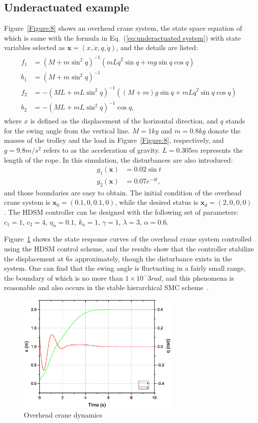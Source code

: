 \documentclass[3p]{elsarticle}
\theoremstyle{plain}
\theoremstyle{remark}
\begin{document}
\subsection{Underactuated example}
Figure~\ref{Figure:8} shows an overhead crane system, the state space equation of which is same with the formula in Eq.~(\ref{eq:underactuated system}) with state variables selected as $\bm x=(x,\dot x,q,\dot q)$, and the details are listed:
\begin{align}
\begin{split}
f_1&=(M+m\sin^2q)^{-1}(mL\dot q^2\sin q+mg\sin q\cos q)\\
b_1&=(M+m\sin^2q)^{-1}\\
f_2&=-(ML+mL\sin^2q)^{-1}((M+m)g\sin q+mL\dot q^2\sin q\cos q)\\
b_2&=-(ML+mL\sin^2q)^{-1}\cos q,
\end{split}
\end{align}
where $x$ is defined as the displacement of the horizontal direction, and $q$ stands for the swing angle from the vertical line. $M=1kg$ and $m=0.8kg$ donate the masses of the trolley and the load in Figure~\ref{Figure:8}, respectively, and $g=9.8m/s^2$ refers to as the acceleration of gravity. $L=0.305m$ represents the length of the rope. In this simulation, the disturbances are also introduced:
\begin{align}
g_1(\bm x)&= 0.02\sin t\\
g_2(\bm x)&=0.07e^{-4t},
\end{align}
and those boundaries are easy to obtain. The initial condition of the overhead crane system is $\bm x_0 = (0.1,0,0.1,0)$, while the desired status is $\bm x_d = (2,0,0,0)$. The HDSM controller can be designed with the following set of parameters:
$c_1=1$, $c_2=4$, $\eta_u = 0.1$, $k_u=1$, $\gamma = 1$, $\lambda = 3$, $\alpha = 0.6$.\par
Figure~\ref{Figure:9} shows the state response curves of the overhead crane system controlled using the HDSM control scheme, and the results show that the controller stabilize the displacement at $6s$ approximately, though the disturbance exists in the system. One can find that the swing angle is fluctuating in a fairly small range, the boundary of which is no more than $1\times 10^-3rad$, and this phenomena is reasonable and also occurs in the stable hierarchical SMC scheme~\cite{wang2004design}.
\begin{figure}[http]
\centering
\includegraphics[width=0.7\textwidth]{paper3_fig9.eps}
\caption{Overhead crane dynamics}
\label{Figure:9}
\end{figure}
\end{document}
